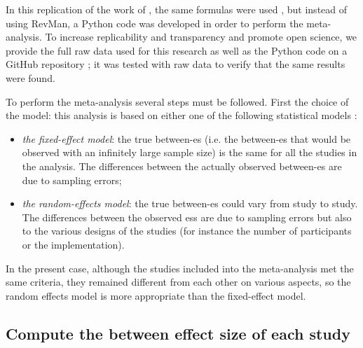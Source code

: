 \documentclass[12pt,a4paper,english]{article}
\begin{document}
In this replication of the work of \citeauthor{Cortese2016}, the same formulas were used \citep{Borenstein2009}, but instead of using RevMan, 
a Python code was developed in order to perform the meta-analysis. To increase replicability and transparency and promote open science, we 
provide the full raw data used for this research as well as the Python code on a GitHub repository \citep{Bussalb2019}; it was tested
with \citet{Cortese2016} raw data to verify that the same results were found. 

To perform the meta-analysis several steps must be followed. First the choice of the model: this analysis is based on either one of the following 
statistical models \citep{Borenstein2009}:
\begin{itemize}
    \item \emph{the fixed-effect model}: the true between-\gls{es} (i.e. the between-\gls{es} that would be observed with an infinitely 
		large sample size) is the same for all the studies in the analysis. The differences between the actually observed between-\gls{es} 
		are due to sampling errors;
    \item \emph{the random-effects model}: the true between-\gls{es} could vary from study to study. The differences between the observed
		\glspl{es} are due to sampling errors but also to the various designs of the studies (for instance the number of participants or the implementation).
\end{itemize}

In the present case, although the studies included into the meta-analysis met the same criteria, they remained different from each other on various aspects,
so the random effects model is more appropriate than the fixed-effect model. 

\subsection{Compute the between effect size of each study}
\end{document}
